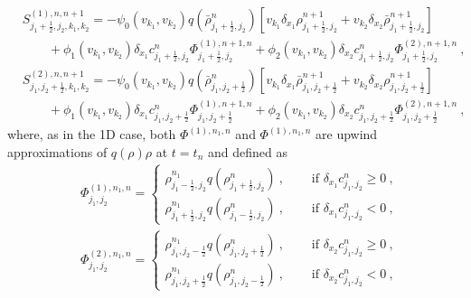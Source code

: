 \documentclass[review,onefignum,onetabnum]{siamart220329}
\begin{document}
\begin{align*}
    & S_{j_1+\frac12, j_2, k_1, k_2}^{(1), n, n+1} = -\psi_{0}(v_{k_1}, v_{k_2})q( \bar{{\rho}}_{j_1+\frac12,j_2}^n)  \left[v_{k_1} \delta_{x_1} \rho_{j_1+\frac12, j_2}^{n+1} + v_{k_2} \delta_{x_2} \bar{\rho}_{j_1+\frac12, j_2}^{n+1} \right] \\
    & \qquad  + \phi_{1}(v_{k_1}, v_{k_2})\delta_{x_1} c_{j_1+\frac12,j_2}^n \Phi^{(1),n+1,n}_{j_1+\frac12,j_2}+\phi_{2}(v_{k_1}, v_{k_2}) \delta_{x_2} c_{j_1+\frac12,j_2}^n
    \Phi^{(2),n+1,n}_{j_1+\frac12,j_2}
    \ ,\\
    & S_{j_1, j_2+\frac12, k_1, k_2}^{(2), n, n+1} = -\psi_{0}(v_{k_1}, v_{k_2})q( \bar{{\rho}}_{j_1,j_2+\frac12}^n)  \left[v_{k_1} \delta_{x_1} \bar{\rho}_{j_1, j_2+\frac12}^{n+1} + v_{k_2} \delta_{x_2} \rho_{j_1, j_2+\frac12}^{n+1} \right] \\
    & \qquad  + \phi_{1}(v_{k_1}, v_{k_2})\delta_{x_1} c_{j_1,j_2+\frac12}^n\Phi^{(1),n+1,n}_{j_1,j_2+\frac12} +\phi_{2}(v_{k_1}, v_{k_2}) \delta_{x_2} c_{j_1,j_2+\frac12}^n 
    \Phi^{(2),n+1,n}_{j_1,j_2+\frac12}
    \ ,
\end{align*}
where, as in the 1D case, both $\Phi^{(1), n_1,n}$ and $\Phi^{(1), n_1,n}$ are upwind approximations of $q(\rho)\rho$ at $t=t_n$ and defined as 
\begin{align*}
    & \Phi^{(1), n_1,n}_{j_1, j_2} = 
	\begin{cases}
		\rho_{j_1 - \frac12,j_2}^{n_1} q(\rho_{j_1+\frac12,j_2}^n)\ , \quad & \text{ if } \delta_{x_1} c_{j_1,j_2}^n \ge 0\ , \\
		\rho_{j_1+\frac12,j_2}^{n_1} q(\rho_{j_1-\frac12,j_2}^n)\ , \quad & \text{ if } \delta_{x_1} c_{j_1,j_2}^n <0\ , 
	\end{cases}\\
	& \Phi^{(2), n_1,n}_{j_1, j_2} = 
	\begin{cases}
		\rho_{j_1,j_2 - \frac12}^{n_1} q(\rho_{j_1,j_2+\frac12}^n)\ , \quad & \text{ if } \delta_{x_2} c_{j_1,j_2}^n \ge 0\ , \\
		\rho_{j_1,j_2+\frac12}^{n_1} q(\rho_{j_1,j_2-\frac12}^n)\ , \quad & \text{ if } \delta_{x_2} c_{j_1,j_2}^n <0\ ,
	\end{cases}
\end{align*}
\end{document}
